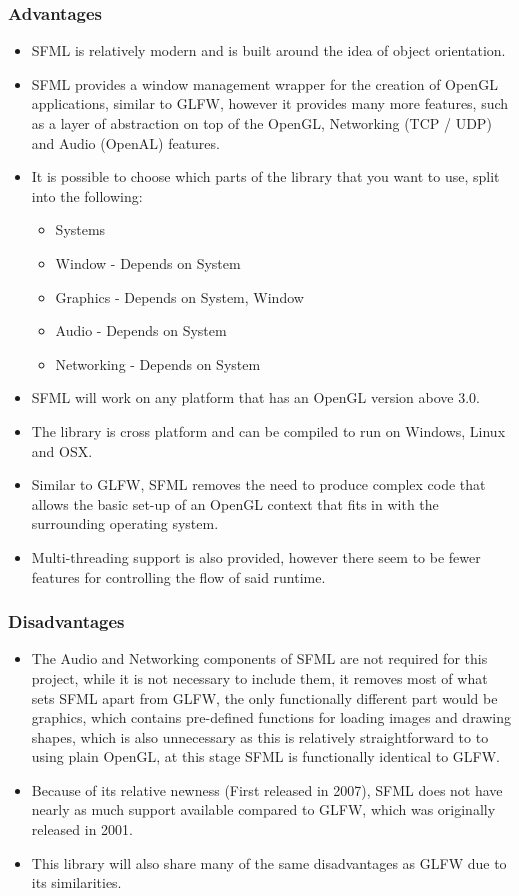 \subsubsection*{Advantages}
\begin{itemize}
\item SFML is relatively modern and is built around the idea of object orientation.
\item SFML provides a window management wrapper for the creation of OpenGL applications, similar to GLFW, however it provides many more features, such as a layer of abstraction on top of the OpenGL, Networking (TCP / UDP) and Audio (OpenAL) features.
\item It is possible to choose which parts of the library that you want to use, split into the following:
  \begin{itemize}
    \item Systems
    \item Window - Depends on System
    \item Graphics - Depends on System, Window
    \item Audio - Depends on System
    \item Networking - Depends on System
  \end{itemize}
\item SFML will work on any platform that has an OpenGL version above 3.0.
\item The library is cross platform and can be compiled to run on Windows, Linux and OSX.
\item Similar to GLFW, SFML removes the need to produce complex code that allows the basic set-up of an OpenGL context that fits in with the surrounding operating system.
\item Multi-threading support is also provided, however there seem to be fewer features for controlling the flow of said runtime.
\end{itemize}
\subsubsection*{Disadvantages}
\begin{itemize}
\item The Audio and Networking components of SFML are not required for this project, while it is not necessary to include them, it removes most of what sets SFML apart from GLFW, the only functionally different part would be graphics, which contains pre-defined functions for loading images and drawing shapes, which is also unnecessary as this is relatively straightforward to to using plain OpenGL, at this stage SFML is functionally identical to GLFW.
\item Because of its relative newness (First released in 2007), SFML does not have nearly as much support available compared to GLFW, which was originally released in 2001.
\item This library will also share many of the same disadvantages as GLFW due to its similarities.
\end{itemize}


